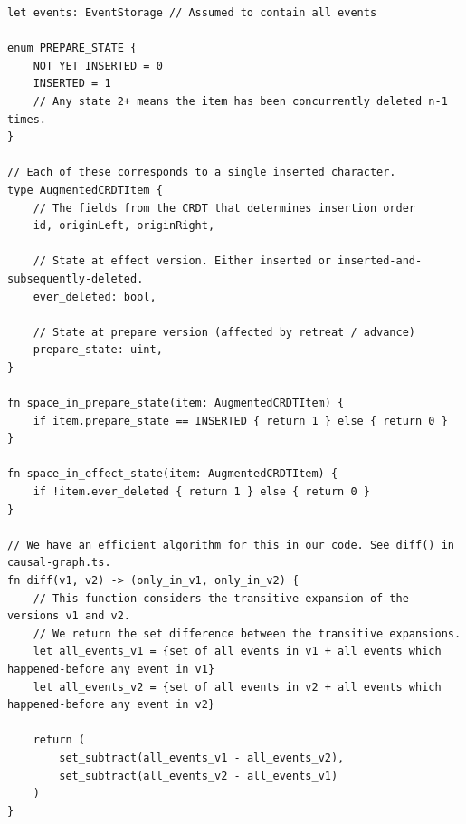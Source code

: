 \documentclass[sigplan,10pt]{acmart}
\newif\ifincludeappendix
\newcommand{\algname}{Eg-walker\xspace}
\begin{document}
\ifincludeappendix
\begin{listing*}
\footnotesize
\begin{verbatim}
let events: EventStorage // Assumed to contain all events

enum PREPARE_STATE {
    NOT_YET_INSERTED = 0
    INSERTED = 1
    // Any state 2+ means the item has been concurrently deleted n-1 times.
}

// Each of these corresponds to a single inserted character.
type AugmentedCRDTItem {
    // The fields from the CRDT that determines insertion order
    id, originLeft, originRight,

    // State at effect version. Either inserted or inserted-and-subsequently-deleted.
    ever_deleted: bool,

    // State at prepare version (affected by retreat / advance)
    prepare_state: uint,
}

fn space_in_prepare_state(item: AugmentedCRDTItem) {
    if item.prepare_state == INSERTED { return 1 } else { return 0 }
}

fn space_in_effect_state(item: AugmentedCRDTItem) {
    if !item.ever_deleted { return 1 } else { return 0 }
}

// We have an efficient algorithm for this in our code. See diff() in causal-graph.ts.
fn diff(v1, v2) -> (only_in_v1, only_in_v2) {
    // This function considers the transitive expansion of the versions v1 and v2.
    // We return the set difference between the transitive expansions.
    let all_events_v1 = {set of all events in v1 + all events which happened-before any event in v1}
    let all_events_v2 = {set of all events in v2 + all events which happened-before any event in v2}

    return (
        set_subtract(all_events_v1 - all_events_v2),
        set_subtract(all_events_v2 - all_events_v1)
    )
}
\end{verbatim}
\caption{Pseudocode for the \algname algorithm (continued in \autoref{pseudocode2}).}\label{pseudocode1}
\end{listing*}
\end{document}

